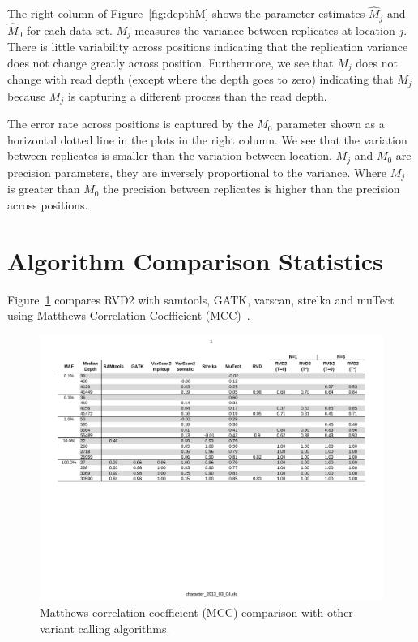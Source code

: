 \documentclass[11pt,reqno]{amsart}
\begin{document}

The right column of Figure~\ref{fig:depthM} shows the parameter estimates $\hat{M}_j$ and $\hat{M}_0$ for each data set. $M_j$ measures the variance between replicates at location $j$. There is little variability across positions indicating that the replication variance does not change greatly across position. Furthermore, we see that $M_j$ does not change with read depth (except where the depth goes to zero) indicating that $M_j$ because $M_j$ is capturing a different process than the read depth.

The error rate across positions is captured by the $M_0$ parameter shown as a horizontal dotted line in the plots in the right column. We see that the variation between replicates is smaller than the variation between location. $M_j$ and $M_0$ are precision parameters, they are inversely proportional to the variance. Where $M_j$ is greater than $M_0$ the precision between replicates is higher than the precision across positions.

\section{Algorithm Comparison Statistics}\label{sec:app_comparison}
Figure~\ref{fig:comparison_mcc} compares RVD2 with samtools, GATK, varscan, strelka and muTect using Matthews Correlation Coefficient (MCC)~\citep{matthews1985homeostasis}.
\begin{figure}[ht]
\begin{center}
\includegraphics[width=1\textwidth]{pdf_figs/comparison_table_mcc.pdf}
\caption{Matthews correlation coefficient (MCC) comparison with other variant calling algorithms.}
\label{fig:comparison_mcc}
\end{center}
\end{figure}
\end{document}
